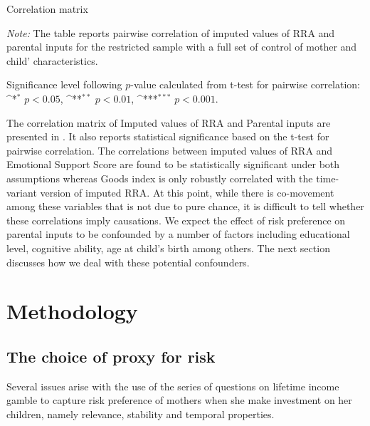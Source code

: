 \documentclass[emulatestandardclasses, 10pt, abstract = true]{scrartcl}
\begin{document}
\begin{sidewaystable}[!tbp]
	\def\sym#1{\ifmmode^{#1}\else\(^{#1}\)\fi}
	\setlength{\extrarowheight}{0.3em}
	\begin{threeparttable}
		\caption{Correlation matrix}
		
		\begin{tablenotes}[flushleft]\footnotesize
			\item \textit{Note:} The table reports pairwise correlation of imputed values of RRA and parental inputs for the restricted sample with a full set of control of mother and child' characteristics.
			\item Significance level following $p$-value calculated from t-test for pairwise correlation: \sym{*} \(p<0.05\), \sym{**} \(p<0.01\), \sym{***} \(p<0.001\).  
		\end{tablenotes}
		\label{table:correlation-matrix}
	\end{threeparttable}
\end{sidewaystable}

The correlation matrix of Imputed values of RRA and Parental inputs are presented in . It also reports statistical significance based on the t-test for pairwise correlation. The correlations between imputed values of RRA and Emotional Support Score are found to be statistically significant under both assumptions whereas Goods index is only robustly correlated with the time-variant version of imputed RRA. At this point, while there is co-movement among these variables that is not due to pure chance, it is difficult to tell whether these correlations imply causations. We expect the effect of risk preference on parental inputs to be confounded by a number of factors including educational level, cognitive ability, age at child's birth among others. The next section discusses how we deal with these potential confounders.   





\section{Methodology}
\subsection{The choice of proxy for risk}
Several issues arise with the use of the series of questions on lifetime income gamble to capture risk preference of mothers when she make investment on her children, namely relevance, stability and temporal properties. 
\end{document}
